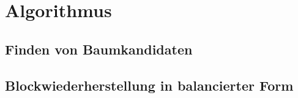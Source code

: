 \chapter{Algorithmus}
\section{Finden von Baumkandidaten}
\section{Blockwiederherstellung in balancierter Form}